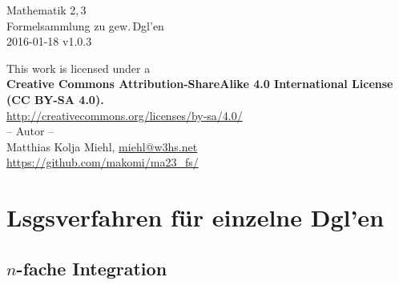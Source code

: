 \documentclass[a4paper,10pt,titlepage]{scrartcl}
\makeatletter
\newcommand{\projectURL}{https://github.com/makomi/ma23\_fs/}
\newcommand{\thisdocDATE}{2016-01-18 v1.0.3}
\newcommand{\myNAME}{Matthias Kolja Miehl}
\newcommand{\myEMAIL}{miehl@w3hs.net}
\makeatother
\begin{document}

\begin{titlepage}
  \vspace*{\fill}
  \begin{center}
    \huge
    Mathematik 2,\,3\\
    Formelsammlung zu gew.\,Dgl'en\\
    \vspace{1.5cm}
    \large
    \thisdocDATE
  \end{center}
  \vspace*{\fill}
  \begin{center}{\fontsize{9pt}{11pt}\selectfont
    This work is licensed under a\\[1em]
    \textbf{Creative Commons Attribution-ShareAlike 4.0 International License (CC BY-SA 4.0).\\[1em]}
    \url{http://creativecommons.org/licenses/by-sa/4.0/}\\
  }
  \vspace*{\fill}
%
  -- Autor -- \medskip\\
  \myNAME, \href{mailto:\myEMAIL}{\myEMAIL}\smallskip\\
  \url{\projectURL}
  \vspace*{1cm}
  \end{center}
\end{titlepage}

\newpage

\setcounter{page}{1}


\section*{Lsgsverfahren für einzelne Dgl'en}
\label{sec:lsgsverfahren_fuer_einzelne_dglen}

\subsection*{$n$-fache Integration}
\label{sec:n-fache_integration}
\end{document}
